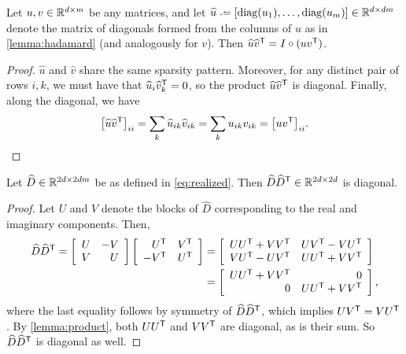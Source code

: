 \documentclass{article} %
\begin{document}
\begin{lemma}
Let ${u, v \in \mathbb{R}^{d\times m}}$ be any matrices, and let ${\widehat{u} \defeq
[\diag(u_1),\dots,\diag(u_m)] \in \R^{d\times dm}}$ denote the 
matrix of diagonals formed from the columns of $u$ as in \cref{lemma:hadamard} 
(and analogously for $v$).  Then $\widehat{u}\widehat{v}^\mathsf{T} = I \circ (uv^\mathsf{T})$.
\label{lemma:product}
\end{lemma}
\begin{proof}
$\widehat{u}$ and $\widehat{v}$ share the same sparsity pattern.  Moreover, for any
distinct pair of rows $i, k$, we must have that $\widehat{u}_i \widehat{v}_k^\mathsf{T} = 0$, 
so the product $\widehat{u}\widehat{v}^\mathsf{T}$ is diagonal.  Finally, along the diagonal, 
we have
\[
{\left[\widehat{u}\widehat{v}^\mathsf{T}\right]}_{ii} = \sum_k \widehat{u}_{ik}
\widehat{v}_{ik} = \sum_{k} u_{ik} v_{ik} = {\left[uv^\mathsf{T}\right]}_{ii}.
\]
\end{proof}

\begin{theorem}
Let $\widehat{D} \in \mathbb{R}^{2d\times 2dm}$ be as defined in \eqref{eq:realized}.  Then
$\widehat{D}\widehat{D}^\mathsf{T} \in \mathbb{R}^{2d\times 2d}$ is diagonal.\label{thm:diagonal}
\end{theorem}
\begin{proof}
Let $U$ and $V$ denote the blocks of $\widehat{D}$ corresponding to the
real and imaginary components.  Then,
\begin{align*}
\widehat{D}\widehat{D}^\mathsf{T} = \left[\begin{array}{rr}U & -V\\ V & U\end{array}\right]
\left[\begin{array}{rr} U^\mathsf{T} & V^\mathsf{T}\\ -V^\mathsf{T} & U^\mathsf{T}\end{array}\right]
&= \left[\begin{array}{rr} UU^\mathsf{T} + VV^\mathsf{T} & UV^\mathsf{T} - VU^\mathsf{T} \\ VU^\mathsf{T} -
UV^\mathsf{T} & UU^\mathsf{T} + VV^\mathsf{T}\end{array} \right]\\
&= \left[\begin{array}{rr}UU^\mathsf{T} + VV^\mathsf{T} & 0 \\ 0 & UU^\mathsf{T} + VV^\mathsf{T}\end{array}
\right],
\end{align*}
where the last equality follows by symmetry of $\widehat{D}\widehat{D}^\mathsf{T}$, which
implies $UV^\mathsf{T} = VU^\mathsf{T}$.  By \cref{lemma:product}, both $UU^\mathsf{T}$ and $VV^\mathsf{T}$ are 
diagonal, as is their sum.  So $\widehat{D}\widehat{D}^\mathsf{T}$ is diagonal as well.
\end{proof}
\end{document}

